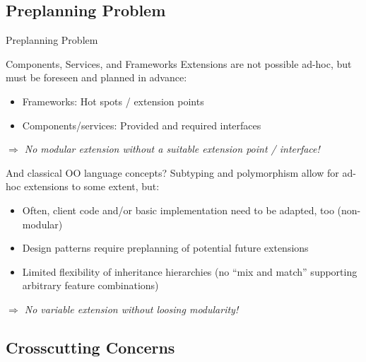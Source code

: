 

\subsection{Preplanning Problem}

\begin{frame}{Preplanning Problem}
	\begin{fancycolumns}[t,widths={45}]
		\begin{note}{Components, Services, and Frameworks}
			Extensions are not possible ad-hoc, but must be foreseen and planned in advance:
			\begin{itemize}
				\item Frameworks: Hot spots / extension points
				\item Components/services: Provided and required interfaces 
			\end{itemize}
			\emph{$\Rightarrow$ No modular extension without a suitable extension point / interface!}
		\end{note}
	\nextcolumn
		\begin{note}{And classical OO language concepts?}
			Subtyping and polymorphism allow for ad-hoc extensions to some extent, but:
			\begin{itemize}
				\item Often, client code and/or basic implementation need to be adapted, too (non-modular)
				\item Design patterns require preplanning of potential future extensions
				\item Limited flexibility of inheritance hierarchies (no ``mix and match'' supporting arbitrary feature combinations)
			\end{itemize}
			\emph{$\Rightarrow$ No variable extension without loosing modularity!}
		\end{note}
	\end{fancycolumns}
\end{frame}

\subsection{Crosscutting Concerns}

